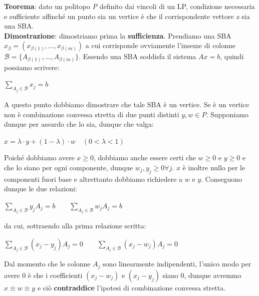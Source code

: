 \documentclass[11pt, oneside]{book}
\begin{document}
\par\bigskip

{\bf Teorema}: dato un politopo {\em P} definito dai vincoli di un LP,
condizione necessaria e sufficiente affinch\'e un punto sia un vertice
\`e che il corrispondente vettore {\em x} sia una SBA.\\ {\bf
  Dimostrazione}: dimostriamo prima la {\bf sufficienza}. Prendiamo
una SBA $x_\beta = (x_{\beta(1)},\dots,x_{\beta(m)})$ a cui
corrisponde ovviamente l'inseme di colonne $\mathcal{B} = \{
A_{\beta(1)},\dots,A_{\beta(m)}\}$. Essendo una SBA soddisfa il
sistema $Ax = b$, quindi possiamo scrivere:

\begin{center}
$\sum\limits_{A_j \in \mathcal{B}} x_j = b$  
\end{center}

A questo punto dobbiamo dimostrare che tale SBA \`e un vertice. Se \`e
un vertice non \`e combinazione convessa stretta di due punti distinti
$y, w\in P$. Supponiamo dunque per assurdo che lo sia, dunque che
valga:

\begin{center}
$x = \lambda \cdot y + (1-\lambda) \cdot w \quad (0 < \lambda < 1)$ 
\end{center}

Poich\'e dobbiamo avere $x \geq 0$, dobbiamo anche essere certi che $w
\geq 0$ e $y \geq 0$ e che lo siano per ogni componente, dunque $w_j, y_j
\geq 0 \forall j$. $x$ \`e inoltre nullo per le componenti fuori base
e altrettanto dobbiamo richiedere a $w$ e $y$. Conseguono dunque le
due relazioni:

\begin{center}
$\sum\limits_{A_j \in \mathcal{B}} y_jA_j =b \qquad \sum\limits_{A_j
    \in \mathcal{B}} w_jA_j =b$
\end{center}

da cui, sottraendo alla prima relazione scritta:

\begin{center}
$\sum\limits_{A_j \in \mathcal{B}} (x_j-y_j)A_j = 0 \qquad \sum\limits_{A_j
    \in \mathcal{B}} (x_j-w_j)A_j = 0$
\end{center}

Dal momento che le colonne $A_j$ sono linearmente indipendenti,
l'unico modo per avere 0 \`e che i coefficienti $(x_j-w_j)$ e
$(x_j-y_j)$ siano 0, dunque avremmo $x \equiv w \equiv y$ e ci\`o {\bf
  contraddice} l'ipotesi di combinazione convessa stretta.

\par\bigskip
\end{document}

